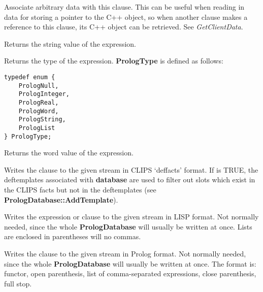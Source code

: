 
Associate arbitrary data with this clause. This can be useful when
reading in data for storing a pointer to the C++ object, so when another
clause makes a reference to this clause, its C++ object can be retrieved.
See {\it GetClientData}.



Returns the string value of the expression.



Returns the type of the expression. {\bf PrologType} is defined as follows:

\begin{verbatim}
typedef enum {
    PrologNull,
    PrologInteger,
    PrologReal,
    PrologWord,
    PrologString,
    PrologList
} PrologType;
\end{verbatim}



Returns the word value of the expression.



Writes the clause to the given stream in CLIPS `deffacts' format. If
 is TRUE, the deftemplates associated with {\bf database} are
used to filter out slots which exist in the CLIPS facts but not in the
deftemplates (see {\bf PrologDatabase::AddTemplate}).



Writes the expression or clause to the given stream in LISP format.
Not normally needed, since the whole {\bf PrologDatabase} will usually
be written at once. Lists are enclosed in parentheses will no commas.



Writes the clause to the given stream in Prolog format. Not normally needed, since
the whole {\bf PrologDatabase} will usually be written at once. The format is:
functor, open parenthesis, list of comma-separated expressions, close parenthesis,
full stop.

